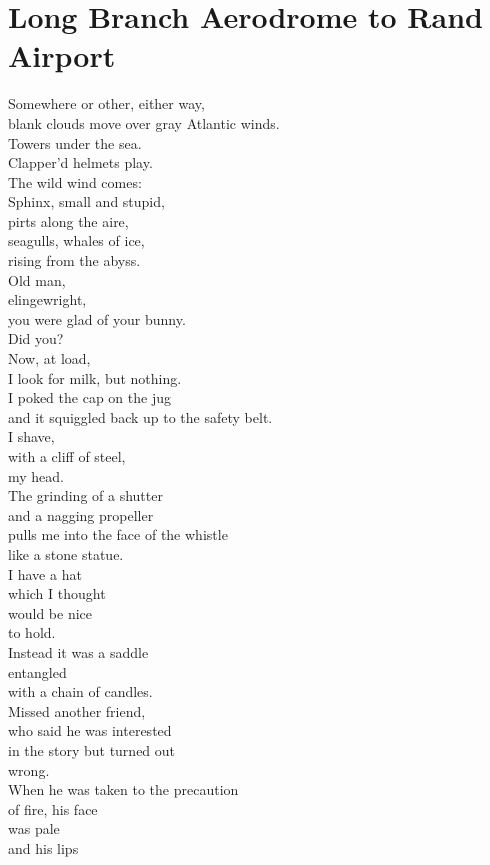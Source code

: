 \documentclass[smalldemyvopaper,11pt,twoside,onecolumn,openright,extrafontsizes]{memoir}
\begin{document}
\chapter{Long Branch Aerodrome to Rand Airport}
Somewhere or other, either way,
\\blank clouds move over gray Atlantic winds.
\\Towers under the sea.
\\Clapper'd helmets play.
\\The wild wind comes:
\\Sphinx, small and stupid,
\\pirts along the aire,
\\seagulls, whales of ice,
\\rising from the abyss.
\\Old man,
\\elingewright,
\\you were glad of your bunny.
\\Did you?
\\Now, at load,
\\I look for milk, but nothing.
\\I poked the cap on the jug
\\and it squiggled back up to the safety belt.
\\I shave,
\\with a cliff of steel,
\\my head.
\\The grinding of a shutter
\\and a nagging propeller
\\pulls me into the face of the whistle
\\like a stone statue.
\\I have a hat
\\which I thought
\\would be nice
\\to hold.
\\Instead it was a saddle
\\entangled
\\with a chain of candles.
\\Missed another friend,
\\who said he was interested
\\in the story but turned out
\\wrong.
\\When he was taken to the precaution
\\of fire, his face
\\was pale
\\and his lips
\end{document}
